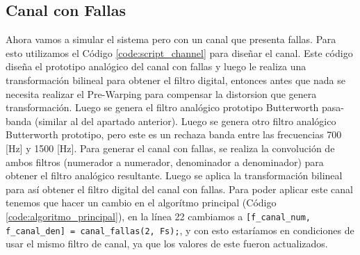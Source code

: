 \subsection{Canal con Fallas}

\begin{figure}[H]
  
\end{figure}

Ahora vamos a simular el sistema pero con un canal que presenta fallas. Para esto utilizamos el Código \ref{code:script_channel} para diseñar el canal. Este código diseña el prototipo analógico del canal con fallas y luego le realiza una transformación bilineal para obtener el filtro digital, entonces antes que nada se necesita realizar el Pre-Warping para compensar la distorsion que genera transformación. Luego se genera el filtro analógico prototipo Butterworth pasa-banda (similar al del apartado anterior). Luego se genera otro filtro analógico Butterworth prototipo, pero este es un rechaza banda entre las frecuencias 700 [Hz] y 1500 [Hz]. Para generar el canal con fallas, se realiza la convolución de ambos filtros (numerador a numerador, denominador a denominador) para obtener el filtro analógico resultante. Luego se aplica la transformación bilineal para así obtener el filtro digital del canal con fallas. Para poder aplicar este canal tenemos que hacer un cambio en el algorítmo principal (Código \ref{code:algoritmo_principal}), en la línea 22 cambiamos a \lstinline{[f_canal_num, f_canal_den] = canal_fallas(2, Fs);}, y con esto estaríamos en condiciones de usar el mismo filtro de canal, ya que los valores de este fueron actualizados.

